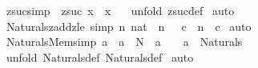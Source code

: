 \begin{isabellebody}
\isamarkupfalse%
%
\endisatagproof
{\isafoldproof}%
%
\isadelimproof
\isanewline
%
\endisadelimproof
\isanewline
{}\isamarkupfalse%
\ zsuc{\isacharunderscore}simp{\isacharcolon}\ \ {\isachardoublequoteopen}{\isacharparenleft}zsuc\ x{\isacharparenright}\ {\isacharequal}\ {\isacharparenleft}x\ {\isacharplus}\ {}{\isacharparenright}{\isachardoublequoteclose}\isanewline
%
\isadelimproof
%
\endisadelimproof
%
\isatagproof
{}\isamarkupfalse%
\ {\isacharparenleft}unfold\ zsuc{\isacharunderscore}def{\isacharparenright}\isanewline
{}\isamarkupfalse%
\ auto\isanewline
{}\isamarkupfalse%
%
\endisatagproof
{\isafoldproof}%
%
\isadelimproof
\isanewline
%
\endisadelimproof
\isanewline
\isanewline
{}\isamarkupfalse%
\ Naturals{\isacharunderscore}{}{\isacharunderscore}zadd{\isacharunderscore}zle\ {\isacharbrackleft}simp{\isacharbrackright}{\isacharcolon}\ {\isachardoublequoteopen}{\isacharbang}{\isacharbang}n{\isachardot}\ {\isacharparenleft}{}{\isacharcolon}{\isacharcolon}nat{\isacharparenright}\ {\isacharless}{\isacharequal}\ n\ {\isacharequal}{\isacharequal}{\isachargreater}\ {\isachartilde}\ {\isacharparenleft}c\ {\isacharplus}\ n\ {\isacharless}{\isacharequal}\ c{\isacharparenright}{\isachardoublequoteclose}\isanewline
%
\isadelimproof
%
\endisadelimproof
%
\isatagproof
{}\isamarkupfalse%
\ auto\isanewline
{}\isamarkupfalse%
%
\endisatagproof
{\isafoldproof}%
%
\isadelimproof
\isanewline
%
\endisadelimproof
\isanewline
\isanewline
{}\isamarkupfalse%
\ Naturals{\isacharunderscore}{}{\isacharunderscore}Mem{\isacharbrackleft}simp{\isacharbrackright}{\isacharcolon}\ {\isachardoublequoteopen}{\isacharbang}{\isacharbang}a{\isachardot}\ {\isacharbrackleft}{\isacharbar}\ a\ {\isacharcolon}\ {\isacharpercent}N\ {\isacharsemicolon}\ a{\isachartilde}{\isacharequal}{}\ {\isacharbar}{\isacharbrackright}\ {\isacharequal}{\isacharequal}{\isachargreater}\ \ {\isacharparenleft}a\ {\isacharcolon}\ Naturals{\isacharunderscore}{}{\isacharparenright}{\isachardoublequoteclose}\isanewline
%
\isadelimproof
%
\endisadelimproof
%
\isatagproof
{}\isamarkupfalse%
\ {\isacharparenleft}unfold\ Naturals{\isacharunderscore}{}{\isacharunderscore}def\ Naturals{\isacharunderscore}def{\isacharparenright}\isanewline
{}\isamarkupfalse%
\ auto\isanewline
{}\isamarkupfalse%
%
\endisatagproof
{\isafoldproof}%
%
\isadelimproof
\isanewline

\end{isabellebody}
